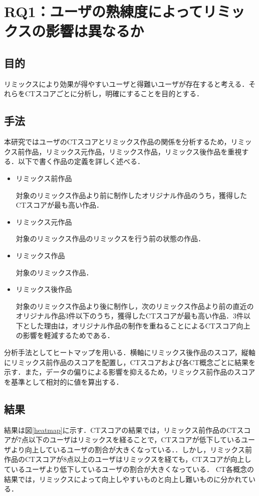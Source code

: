 \documentclass[submit,techrep,noauthor]{ipsj}
\begin{document}
\section{RQ1：ユーザの熟練度によってリミックスの影響は異なるか}
\subsection{目的}
リミックスにより効果が得やすいユーザと得難いユーザが存在すると考える．それらをCTスコアごとに分析し，明確にすることを目的とする．

\subsection{手法}
本研究ではユーザのCTスコアとリミックス作品の関係を分析するため，リミックス前作品，リミックス元作品，リミックス作品，リミックス後作品を重視する．以下で書く作品の定義を詳しく述べる．

\begin{itemize}
    \item リミックス前作品
    
    対象のリミックス作品より前に制作したオリジナル作品のうち，獲得したCTスコアが最も高い作品．
    
    \item リミックス元作品

    対象のリミックス作品のリミックスを行う前の状態の作品．
    
    \item リミックス作品

    対象のリミックス作品．
    
    \item リミックス後作品

    対象のリミックス作品より後に制作し，次のリミックス作品より前の直近のオリジナル作品3件以下のうち，獲得したCTスコアが最も高い作品．3件以下とした理由は，オリジナル作品の制作を重ねることによるCTスコア向上の影響を軽減するためである．
    
\end{itemize}

分析手法としてヒートマップを用いる．横軸にリミックス後作品のスコア，縦軸にリミックス前作品のスコアを配置し，CTスコアおよび各CT概念ごとに結果を示す．また，データの偏りによる影響を抑えるため，リミックス前作品のスコアを基準として相対的に値を算出する．

\subsection{結果}
結果は図\ref{heatmap}に示す．CTスコアの結果では，リミックス前作品のCTスコアが7点以下のユーザはリミックスを経ることで，CTスコアが低下しているユーザより向上しているユーザの割合が大きくなっている．．しかし，リミックス前作品のCTスコアが8点以上のユーザはリミックスを経ても，CTスコアが向上しているユーザより低下しているユーザの割合が大きくなっている．
CT各概念の結果では，リミックスによって向上しやすいものと向上し難いものに分かれている．
\end{document}
